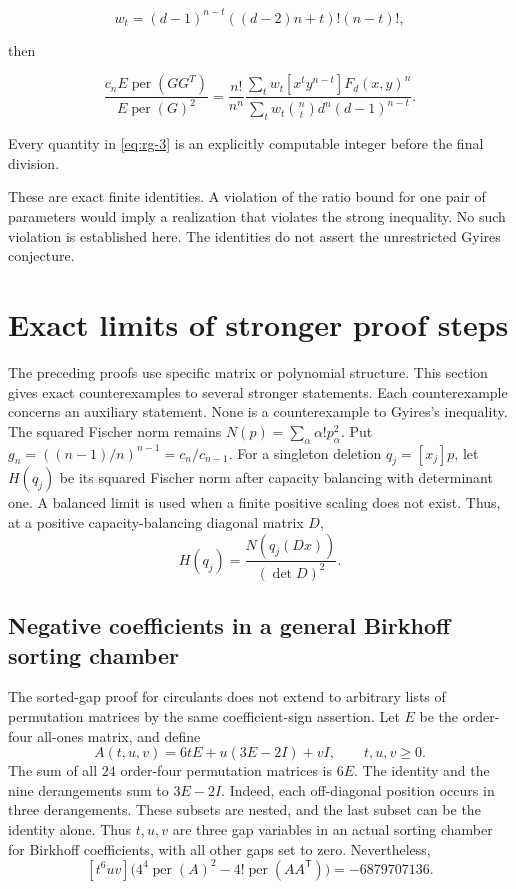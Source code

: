 \documentclass[11pt,a4paper]{article}
\theoremstyle{definition}
\theoremstyle{remark}
\newcommand{\per}{\operatorname{per}}
\newcommand{\T}{\mathsf{T}}
\begin{document}
\[
w_t=(d-1)^{n-t}((d-2)n+t)!(n-t)!,
\]

then

\begin{equation}\label{eq:rg-3}
\frac{c_nE\operatorname{per}(GG^T)}{E\operatorname{per}(G)^2}
=\frac{n!}{n^n}
\frac{\sum_t w_t[x^ty^{n-t}]F_d(x,y)^n}
     {\sum_t w_t\binom nt d^n(d-1)^{n-t}}.
\end{equation}

Every quantity in \eqref{eq:rg-3} is an explicitly computable integer before the
final division.

These are exact finite identities. A violation of the ratio bound for
one pair of parameters would imply a realization that violates the
strong inequality. No such violation is established here. The identities
do not assert the unrestricted Gyires conjecture.


\section{Exact limits of stronger proof steps}\label{sec:obstructions}

The preceding proofs use specific matrix or polynomial structure.
This section gives exact counterexamples to several stronger statements.
Each counterexample concerns an auxiliary statement.
None is a counterexample to Gyires's inequality.
The squared Fischer norm remains
$N(p)=\sum_\alpha\alpha!p_\alpha^2$. Put
$g_n=((n-1)/n)^{n-1}=c_n/c_{n-1}$.
For a singleton deletion $q_j=[x_j]p$, let $H(q_j)$ be its squared Fischer norm after
capacity balancing with determinant one.
A balanced limit is used when a finite positive scaling does not exist.
Thus, at a positive capacity-balancing diagonal matrix $D$,
\[
 H(q_j)=\frac{N(q_j(Dx))}{(\det D)^2}.
\]

\subsection{Negative coefficients in a general Birkhoff sorting chamber}

The sorted-gap proof for circulants does not extend to arbitrary lists of
permutation matrices by the same coefficient-sign assertion.
Let $E$ be the order-four all-ones matrix, and define
\[
 A(t,u,v)=6tE+u(3E-2I)+vI,\qquad t,u,v\ge0.
\]
The sum of all $24$ order-four permutation matrices is $6E$.
The identity and the nine derangements sum to $3E-2I$.
Indeed, each off-diagonal position occurs in three derangements.
These subsets are nested, and the last subset can be the identity alone.
Thus $t,u,v$ are three gap variables in an actual sorting chamber for
Birkhoff coefficients, with all other gaps set to zero.
Nevertheless,
\begin{equation}\label{eq:obs-birkhoff}
 [t^6uv]\bigl(4^4\per(A)^2-4!\per(AA^\T)\bigr)=-6879707136.
\end{equation}
\end{document}
